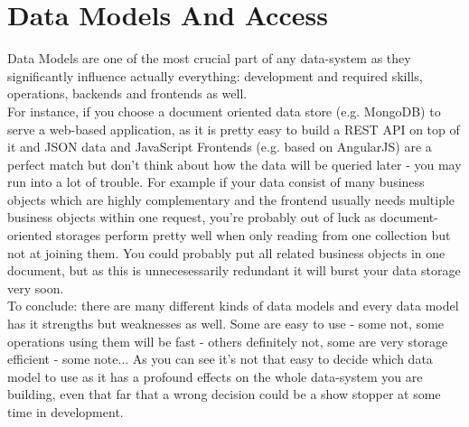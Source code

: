 \section{Data Models And Access}
\label{tf_dma}
Data Models are one of the most crucial part of any data-system as they significantly influence actually everything: development and required skills, operations, backends and frontends as well. \\
For instance, if you choose a document oriented data store (e.g. MongoDB) to serve a web-based application, as it is pretty easy to build a REST API on top of it and JSON data and JavaScript Frontends (e.g. based on AngularJS) are a perfect match but don't think about how the data will be queried later - you may run into a lot of trouble. For example if your data consist of many business objects which are highly complementary and the frontend usually needs multiple business objects within one request, you're probably out of luck as document-oriented storages perform pretty well when only reading from one collection but not at joining them. You could probably put all related business objects in one document, but as this is unnecesessarily redundant it will burst your data storage very soon. \\
To conclude: there are many different kinds of data models and every data model has it strengths but weaknesses as well. Some are easy to use - some not, some operations using them will be fast - others definitely not, some are very storage efficient - some note... As you can see it's not that easy to decide which data model to use as it has a profound effects on the whole data-system you are building, even that far that a wrong decision could be a show stopper at some time in development.\\

